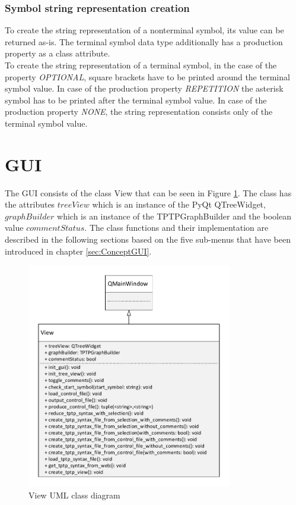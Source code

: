 \subsubsection{Symbol string representation creation}
To create the string representation of a nonterminal symbol, its value can be returned as-is.
The terminal symbol data type additionally has a production property as a class attribute.\\
To create the string representation of a terminal symbol, in the case of the property \textit{OPTIONAL}, square brackets have to be printed around the terminal symbol value. In case of the production property \textit{REPETITION} the asterisk symbol has to be printed after the terminal symbol value. In case of the production property \textit{NONE}, the string representation consists only of the terminal symbol value.

\section{GUI}\label{sec:ImplementationGUI}

The GUI consists of the class View that can be seen in Figure \ref{fig:ImplementationViewClassDiagram}. The class has the attributes $treeView$ which is an instance of the PyQt QTreeWidget, $graphBuilder$ which is an instance of the TPTPGraphBuilder and the boolean value $commentStatus$. The class functions and their implementation are described in the following sections based on the five sub-menus that have been introduced in chapter \ref{sec:ConceptGUI}.

\begin{figure}[H]
\centering
\includegraphics[width=0.8\textwidth]{images/Implementation_view_class_diagramm.pdf}
\caption{View UML class diagram}
\label{fig:ImplementationViewClassDiagram}
\end{figure}

